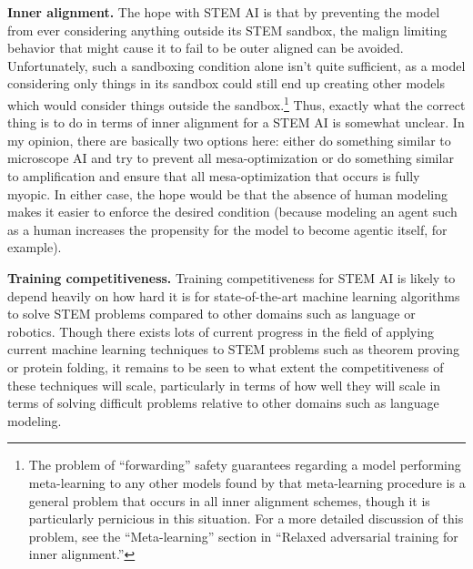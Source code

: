 \textbf{Inner alignment.} The hope with STEM AI is that by preventing the model from ever considering anything outside its STEM sandbox, the malign limiting behavior that might cause it to fail to be outer aligned can be avoided. Unfortunately, such a sandboxing condition alone isn't quite sufficient, as a model considering only things in its sandbox could still end up creating other models which would consider things outside the sandbox.\footnote{The problem of ``forwarding'' safety guarantees regarding a model performing meta-learning to any other models found by that meta-learning procedure is a general problem that occurs in all inner alignment schemes, though it is particularly pernicious in this situation. For a more detailed discussion of this problem, see the ``Meta-learning'' section in ``Relaxed adversarial training for inner alignment\cite{TODO: cite https://www.alignmentforum.org/posts/9Dy5YRaoCxH9zuJqa/relaxed-adversarial-training-for-inner-alignment}.''} Thus, exactly what the correct thing is to do in terms of inner alignment for a STEM AI is somewhat unclear. In my opinion, there are basically two options here: either do something similar to microscope AI and try to prevent all mesa-optimization or do something similar to amplification and ensure that all mesa-optimization that occurs is fully myopic\cite{TODO: cite https://www.alignmentforum.org/posts/BKM8uQS6QdJPZLqCr/towards-a-mechanistic-understanding-of-corrigibility}. In either case, the hope would be that the absence of human modeling makes it easier to enforce the desired condition (because modeling an agent such as a human increases the propensity for the model to become agentic itself, for example).

\textbf{Training competitiveness.} Training competitiveness for STEM AI is likely to depend heavily on how hard it is for state-of-the-art machine learning algorithms to solve STEM problems compared to other domains such as language or robotics. Though there exists lots of current progress in the field of applying current machine learning techniques to STEM problems such as theorem\cite{TODO: cite https://arxiv.org/abs/1811.00796} proving\cite{TODO: cite https://arxiv.org/abs/1904.03241} or protein folding\cite{TODO: cite https://deepmind.com/blog/article/AlphaFold-Using-AI-for-scientific-discovery}, it remains to be seen to what extent the competitiveness of these techniques will scale, particularly in terms of how well they will scale in terms of solving difficult problems relative to other domains such as language modeling.

